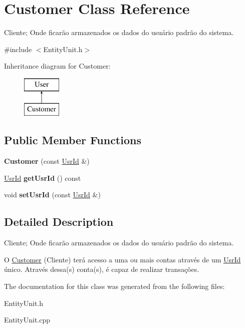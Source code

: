 \hypertarget{classCustomer}{\section{Customer Class Reference}
\label{classCustomer}
}


Cliente; Onde ficarão armazenados os dados do usuário padrão do sistema.  




{\ttfamily \#include $<$Entity\-Unit.\-h$>$}

Inheritance diagram for Customer\-:\begin{figure}[H]
\begin{center}
\leavevmode
\includegraphics[height=2.000000cm]{classCustomer}
\end{center}
\end{figure}
\subsection*{Public Member Functions}
\begin{DoxyCompactItemize}
\item 
\hypertarget{classCustomer_a0dff420b710e429da6501da5f820b0ba}{{\bfseries Customer} (const \hyperlink{classUsrId}{Usr\-Id} \&)}\label{classCustomer_a0dff420b710e429da6501da5f820b0ba}

\item 
\hypertarget{classCustomer_a76d325591ef27599cb1d7f3e4b77b8d4}{\hyperlink{classUsrId}{Usr\-Id} {\bfseries get\-Usr\-Id} () const }\label{classCustomer_a76d325591ef27599cb1d7f3e4b77b8d4}

\item 
\hypertarget{classCustomer_a89b74269a4750193d61b305b13df82fa}{void {\bfseries set\-Usr\-Id} (const \hyperlink{classUsrId}{Usr\-Id} \&)}\label{classCustomer_a89b74269a4750193d61b305b13df82fa}

\end{DoxyCompactItemize}


\subsection{Detailed Description}
Cliente; Onde ficarão armazenados os dados do usuário padrão do sistema. 

O \hyperlink{classCustomer}{Customer} (Cliente) terá acesso a uma ou mais contas através de um \hyperlink{classUsrId}{Usr\-Id} único. Através dessa(s) conta(s), é capaz de realizar transações. 

The documentation for this class was generated from the following files\-:\begin{DoxyCompactItemize}
\item 
Entity\-Unit.\-h\item 
Entity\-Unit.\-cpp\end{DoxyCompactItemize}
